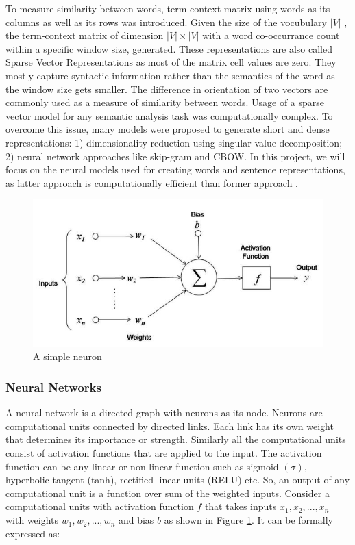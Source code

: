 \documentclass[12pt]{report} %
\begin{document}
To measure similarity between words, term-context matrix using words as its columns as well as its rows was introduced. Given the size of the vocubulary $|V|$ , the term-context matrix of dimension $|V| \times |V|$ with a word co-occurrance count within a specific window size,  generated. These representations are also called Sparse Vector Representations as most of the matrix cell values are zero. They mostly capture syntactic information rather than the semantics of the word as the window size gets smaller. The difference in orientation of two vectors are commonly used as a measure of similarity between words. Usage of a sparse vector model for any semantic analysis task was computationally complex. To overcome this issue, many models were proposed to generate short and dense representations: 1) dimensionality reduction using singular value decomposition; 2) neural network approaches like skip-gram and CBOW. In this project, we will focus on the neural models used for creating words and sentence representations, as latter approach is computationally efficient than former approach \citep{jurafsky2014speech}.

\begin{figure}[!tbp]
	\centering
	\includegraphics[scale=0.50]{image/neuron.jpg}
	\caption{A simple neuron}
	\label{neuron}
\end{figure}

\subsubsection{Neural Networks}

A neural network is a directed graph with neurons as its node. Neurons are computational units connected by directed links. Each link has its own weight that determines its importance or strength. Similarly all the computational units consist of activation functions that are applied to the input. The activation function can be any linear or non-linear function such as sigmoid $(\sigma)$, hyperbolic tangent (tanh), rectified linear units (RELU) etc. So, an output of any computational unit is a function over sum of the weighted inputs. Consider a computational units with activation function $f$ that takes inputs $x_{1},x_{2},...,x_{n}$ with weights $w_{1},w_{2},...,w_{n}$ and bias $b$ as shown in Figure \ref{neuron}. It can be  formally expressed as:
\end{document}
